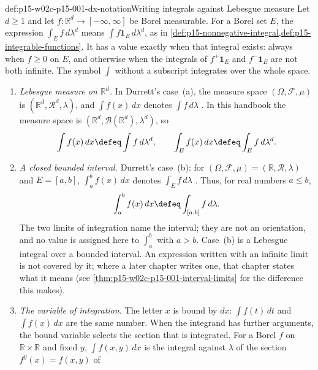 \begin{hbconvention}{def:p15-w02c-p15-001-dx-notation}{Writing integrals against Lebesgue measure}
Let \(d\geq1\) and let \(f:\mathbb R^d\to[-\infty,\infty]\) be Borel
measurable. For a Borel set \(E\), the expression
\(\int_E f\,d\lambda^d\) means \(\int f\mathbf1_E\,d\lambda^d\), as in
\cref{def:p15-nonnegative-integral,def:p15-integrable-functions}. It has a
value exactly when that integral exists: always when \(f\geq0\) on
\(E\), and otherwise when the integrals of \(f^+\mathbf1_E\) and
\(f^-\mathbf1_E\) are not both infinite. The symbol \(\int\) without a
subscript integrates over the whole space.
\begin{enumerate}
\item \emph{Lebesgue measure on
      \(\mathbb R^d\).} In Durrett's case~(a), the measure space
      \((\Omega,\mathcal F,\mu)\) is
      \((\mathbb R^d,\mathcal R^d,\lambda)\), and \(\int f(x)\,dx\) denotes \(\int f\,d\lambda\)
      \cite[sec.~1.4, p.~23]{DurrettPTEAuthor2019}. In this handbook
      the measure space is \((\mathbb R^d,\mathcal B(\mathbb R^d),\lambda^d)\),
      so
      \[
       \int f(x)\,dx\defeq\int f\,d\lambda^d,\qquad
       \int_E f(x)\,dx\defeq\int_E f\,d\lambda^d .
      \]
\item \emph{A closed bounded
      interval.} Durrett's case~(b): for
      \((\Omega,\mathcal F,\mu)=(\mathbb R,\mathcal R,\lambda)\) and
      \(E=[a,b]\), \(\int_a^b f(x)\,dx\) denotes \(\int_E f\,d\lambda\)
      \cite[sec.~1.4, p.~23]{DurrettPTEAuthor2019}. Thus, for real
      numbers \(a\leq b\),
      \[
       \int_a^b f(x)\,dx\defeq\int_{[a,b]}f\,d\lambda .
      \]
      The two limits of integration name the interval; they are not an
      orientation, and no value is assigned here to \(\int_a^b\) with
      \(a>b\). Case~(b) is a Lebesgue integral over a bounded interval.
      An expression written with an infinite limit is not covered by it;
      where a later chapter writes one, that chapter states what it
      means (see \cref{thm:p15-w02c-p15-001-interval-limits} for the
      difference this makes).
\item \emph{The variable of
      integration.} The letter \(x\) is bound by \(dx\): \(\int f(t)\,dt\)
      and \(\int f(x)\,dx\) are the same number. When the integrand has
      further arguments, the bound variable selects the section that is
      integrated. For a Borel \(f\) on \(\mathbb R\times\mathbb R\) and
      fixed \(y\), \(\int f(x,y)\,dx\) is the integral against
      \(\lambda\) of the section \(f^y(x)=f(x,y)\) of

\end{enumerate}
\end{hbconvention}
